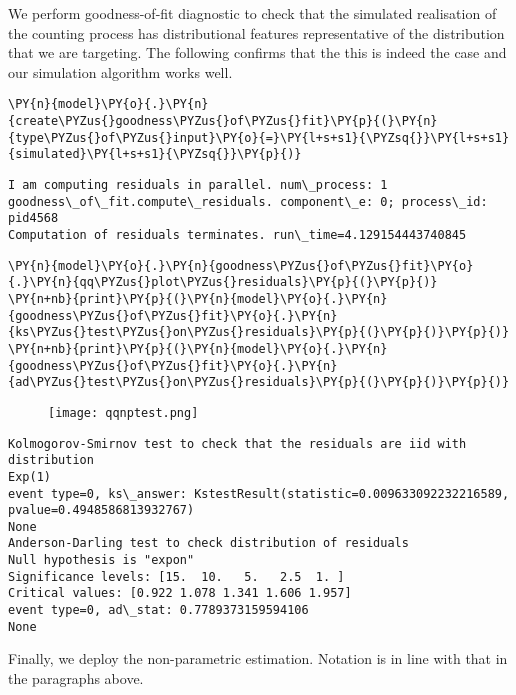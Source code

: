 \documentclass[10pt, article,table]{article}
\begin{document}
We perform goodness-of-fit diagnostic to check that the simulated realisation of the counting process has distributional features representative of the distribution that we are targeting. The following confirms that the this is indeed the case and our simulation algorithm works well.

    \begin{tcolorbox}[breakable, size=fbox, boxrule=1pt, pad at break*=1mm,colback=cellbackground, colframe=cellborder]
\begin{Verbatim}[commandchars=\\\{\}]
\PY{n}{model}\PY{o}{.}\PY{n}{create\PYZus{}goodness\PYZus{}of\PYZus{}fit}\PY{p}{(}\PY{n}{type\PYZus{}of\PYZus{}input}\PY{o}{=}\PY{l+s+s1}{\PYZsq{}}\PY{l+s+s1}{simulated}\PY{l+s+s1}{\PYZsq{}}\PY{p}{)}
\end{Verbatim}
\end{tcolorbox}

    \begin{Verbatim}[commandchars=\\\{\}]
I am computing residuals in parallel. num\_process: 1
goodness\_of\_fit.compute\_residuals. component\_e: 0; process\_id: pid4568
Computation of residuals terminates. run\_time=4.129154443740845
    \end{Verbatim}

    \begin{tcolorbox}[breakable, size=fbox, boxrule=1pt, pad at break*=1mm,colback=cellbackground, colframe=cellborder]
\begin{Verbatim}[commandchars=\\\{\}]
\PY{n}{model}\PY{o}{.}\PY{n}{goodness\PYZus{}of\PYZus{}fit}\PY{o}{.}\PY{n}{qq\PYZus{}plot\PYZus{}residuals}\PY{p}{(}\PY{p}{)}
\PY{n+nb}{print}\PY{p}{(}\PY{n}{model}\PY{o}{.}\PY{n}{goodness\PYZus{}of\PYZus{}fit}\PY{o}{.}\PY{n}{ks\PYZus{}test\PYZus{}on\PYZus{}residuals}\PY{p}{(}\PY{p}{)}\PY{p}{)}
\PY{n+nb}{print}\PY{p}{(}\PY{n}{model}\PY{o}{.}\PY{n}{goodness\PYZus{}of\PYZus{}fit}\PY{o}{.}\PY{n}{ad\PYZus{}test\PYZus{}on\PYZus{}residuals}\PY{p}{(}\PY{p}{)}\PY{p}{)}
\end{Verbatim}
\end{tcolorbox}
\begin{figure}[H]
 \texttt{[image: qqnptest.png]}
\end{figure}

    \begin{Verbatim}[commandchars=\\\{\}]
Kolmogorov-Smirnov test to check that the residuals are iid with distribution
Exp(1)
event type=0, ks\_answer: KstestResult(statistic=0.009633092232216589,
pvalue=0.4948586813932767)
None
Anderson-Darling test to check distribution of residuals
Null hypothesis is "expon"
Significance levels: [15.  10.   5.   2.5  1. ]
Critical values: [0.922 1.078 1.341 1.606 1.957]
event type=0, ad\_stat: 0.7789373159594106
None
    \end{Verbatim}
Finally, we deploy the non-parametric estimation. Notation is in line with that in the paragraphs above. 
\end{document}
